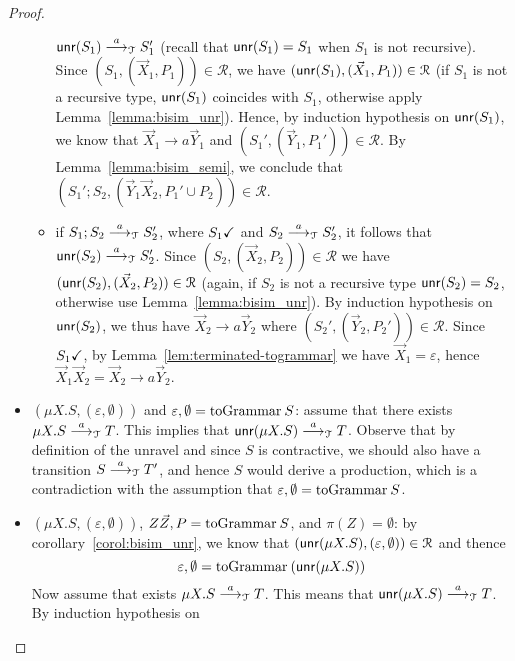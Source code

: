 \begin{proof}
\begin{itemize}
\begin{itemize}
    	$\Unravel(S_1)\LTSderives[a] S_1'$ (recall that $\Unravel(S_1)=S_1$ when
    	$S_1$ is not recursive). 
    	Since $(S_1,(\vec X_1, P_1))\in\mathcal{R}$, we have
    	$(\Unravel(S_1), (\vec X_1, P_1))\in \mathcal{R}$ 
    	(if $S_1$ is not a recursive type, $\Unravel(S_1)$ 
    	coincides with $S_1$, otherwise apply Lemma~\ref{lemma:bisim_unr}).
    	Hence, by induction hypothesis on $\Unravel(S_1)$, we know that 
    	$\vec X_1 \rightarrow a \vec Y_1$ and 
    	$(S_1', (\vec Y_1,P_1'))\in \mathcal{R}$. 
    	By Lemma~\ref{lemma:bisim_semi}, we conclude that 
    	$(S_1';S_2, (\vec Y_1 \vec X_2,P_1'\cup P_2))\in \mathcal{R}$. 
    	\item if $S_1;S_2\LTSderives[a] S_2'$, where $\DONE{S_1}$ and 
    	$S_2\LTSderives[a] S_2'$, it follows that 
    	$\Unravel(S_2)\LTSderives[a] S_2'$. 
    	Since $(S_2, (\vec X_2, P_2))\in \mathcal{R}$ we have 
    	$(\Unravel(S_2), (\vec X_2, P_2))\in \mathcal{R}$ (again, 
    	if $S_2$ is not a recursive type $\Unravel(S_2)=S_2$, 
    	otherwise use Lemma~\ref{lemma:bisim_unr}). 
    	By induction hypothesis on $\Unravel(S_2)$, we thus have
    	$\vec X_2 \rightarrow a \vec Y_2$ where 
    	$(S_2', (\vec Y_2,P_2'))\in \mathcal{R}$. Since $\DONE{S_1}$, by
    	Lemma~\ref{lem:terminated-togrammar} we have $\vec X_1 = \varepsilon$, 
    	hence $\vec X_1 \vec X_2 = \vec X_2 \rightarrow a \vec Y_2$.
    	\end{itemize}
		\item $(\mu X.S, (\varepsilon, \emptyset))$ and $\varepsilon, \emptyset = \toGrammarf{S}$: 
    	assume that there exists $\mu X.S  \LTSderives[a] T$. This
    	implies that $\Unravel(\mu X.S)  \LTSderives[a] T$. Observe that
    	by definition of the unravel and since $S$ is contractive, we should
    	also have a transition $S  \LTSderives[a] T'$, and hence $S$ would derive a 
    	production, which is a contradiction with
    	the assumption that $\varepsilon, \emptyset = \toGrammarf{S}$.
    	\item $(\mu X.S, (\varepsilon, \emptyset))$, $Z\vec Z, P = \toGrammarf{S}$, and $\pi(Z)=\emptyset$: 
    	by corollary~\ref{corol:bisim_unr}, we know that 
    	$(\Unravel(\mu X.S), (\varepsilon, \emptyset)) \in \mathcal{R}$ and thence
    	\begin{equation}
    	\label{eq:unr}
    		\varepsilon, \emptyset = \toGrammarf{(\Unravel(\mu X.S))}	
    	\end{equation}
    	Now assume that
    	exists $\mu X.S  \LTSderives[a] T$. This means that 
    	$\Unravel(\mu X.S) \LTSderives[a] T$. By induction hypothesis on 

\end{itemize}
\end{proof}
